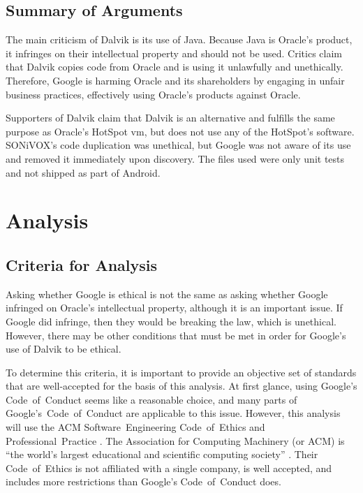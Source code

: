 \documentclass[11pt]{article}
\begin{document}
\begin{multicols}{2}


\subsection{Summary of Arguments} %
\label{sub:args-summary}

The main criticism of Dalvik is its use of Java.  Because Java is Oracle's
product, it infringes on their intellectual property and should not be used.
Critics claim that Dalvik copies code from Oracle and is using it unlawfully and
unethically.  Therefore, Google is harming Oracle and its shareholders by
engaging in unfair business practices, effectively using Oracle's products
against Oracle.

Supporters of Dalvik claim that Dalvik is an alternative and fulfills the same
purpose as Oracle's HotSpot \gls{vm}, but does not use any of the HotSpot's
software.  SONiVOX's code duplication was unethical, but Google was not aware of
its use and removed it immediately upon discovery.  The files used were only
unit tests and not shipped as part of Android.



\section{Analysis} %
\label{sec:analysis}

\subsection{Criteria for Analysis} %
\label{sub:criteria}

Asking whether Google is ethical is not the same as asking whether Google
infringed on Oracle's intellectual property, although it is an important issue.
If Google did infringe, then they would be breaking the law, which is unethical.
However, there may be other conditions that must be met in order for Google's
use of Dalvik to be ethical.

To determine this criteria, it is important to provide an objective set of
standards that are well-accepted for the basis of this analysis.  At first
glance, using Google's Code~of~Conduct \cite{google-conduct} seems like a
reasonable choice, and many parts of Google's~Code~of~Conduct are applicable to
this issue.  However, this analysis will use the ACM Software~Engineering
Code~of~Ethics and Professional~Practice \cite{secode}.  The Association for
Computing Machinery (or ACM) is ``the world's largest educational and scientific
computing society'' \cite{acm}.  Their Code~of~Ethics is not affiliated with a
single company, is well accepted, and includes more restrictions than Google's
Code~of~Conduct does.


\end{multicols}
\end{document}
